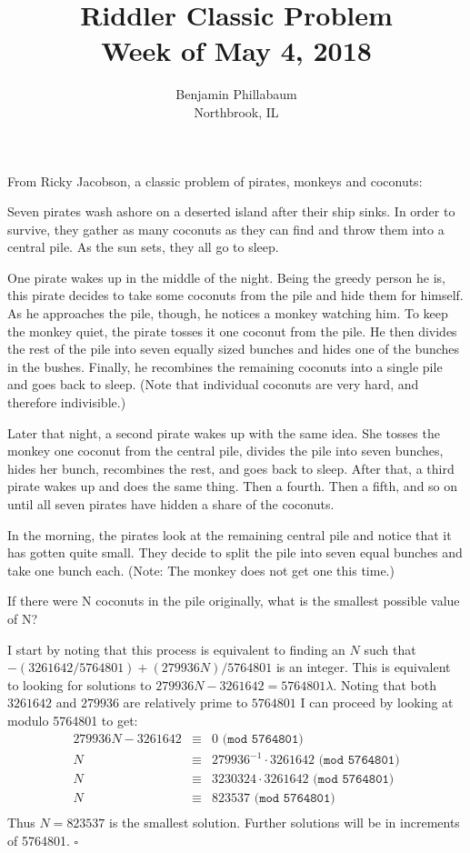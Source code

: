 \documentclass[11pt]{article}
\title{Riddler Classic Problem\\Week of May 4, 2018}
\author{Benjamin Phillabaum\\Northbrook, IL}
\begin{document}
\maketitle
\newpage

\begin{framed}
From Ricky Jacobson, a classic problem of pirates, monkeys and coconuts:

Seven pirates wash ashore on a deserted island after their ship sinks. In order to survive, they gather as many coconuts as they can find and throw them into a central pile. As the sun sets, they all go to sleep.

One pirate wakes up in the middle of the night. Being the greedy person he is, this pirate decides to take some coconuts from the pile and hide them for himself. As he approaches the pile, though, he notices a monkey watching him. To keep the monkey quiet, the pirate tosses it one coconut from the pile. He then divides the rest of the pile into seven equally sized bunches and hides one of the bunches in the bushes. Finally, he recombines the remaining coconuts into a single pile and goes back to sleep. (Note that individual coconuts are very hard, and therefore indivisible.)

Later that night, a second pirate wakes up with the same idea. She tosses the monkey one coconut from the central pile, divides the pile into seven bunches, hides her bunch, recombines the rest, and goes back to sleep. After that, a third pirate wakes up and does the same thing. Then a fourth. Then a fifth, and so on until all seven pirates have hidden a share of the coconuts.

In the morning, the pirates look at the remaining central pile and notice that it has gotten quite small. They decide to split the pile into seven equal bunches and take one bunch each. (Note: The monkey does not get one this time.)

If there were N coconuts in the pile originally, what is the smallest possible value of N?

\end{framed}
I start by noting that this process is equivalent to finding an $N$ such that $-(3261642/5764801) + (279936 N)/5764801$ is an integer. This is equivalent to looking for solutions to $279936 N - 3261642 = 5764801 \lambda$. Noting that both $3261642$ and $279936$ are relatively prime to $5764801$ I can proceed by looking at modulo 5764801 to get:
\begin{eqnarray}
279936 N - 3261642 &\equiv& 0 \texttt{ (mod 5764801)}\\
N &\equiv&  279936^{-1} \cdot 3261642  \texttt{ (mod 5764801)}\\
N &\equiv&  3230324 \cdot 3261642  \texttt{ (mod 5764801)}\\
N &\equiv&  823537  \texttt{ (mod 5764801)}\\
\end{eqnarray}
Thus $N=823537$ is the smallest solution. Further solutions will be in increments of 5764801.
$\square$
\end{document}
